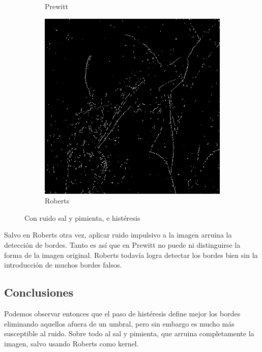 \documentclass[a4paper]{article}
\begin{document}
\begin{figure}[H]
\begin{subfigure}[t]{0.3\textwidth}
	\caption{Prewitt}
	\end{subfigure}
	\begin{subfigure}[t]{0.3\textwidth}
	\centering
	\includegraphics[width=\textwidth]{imagenesInforme/lenaHysteresisSaltAndPepperRoberts}
	\caption{Roberts}
	\end{subfigure}
\caption{Con ruido sal y pimienta, e histéresis}
\end{figure}

Salvo en Roberts otra vez, aplicar ruido impulsivo a la imagen arruina la detección de bordes. Tanto es así que en Prewitt no puede ni distinguirse la forma de la imagen original. Roberts todavía logra detectar los bordes bien sin la introducción de muchos bordes falsos.

\subsection*{Conclusiones}

Podemos observar entonces que el paso de histéresis define mejor los bordes eliminando aquellos afuera de un umbral, pero sin embargo es mucho más susceptible al ruido. Sobre todo al sal y pimienta, que arruina completamente la imagen, salvo usando Roberts como kernel.
\end{document}
